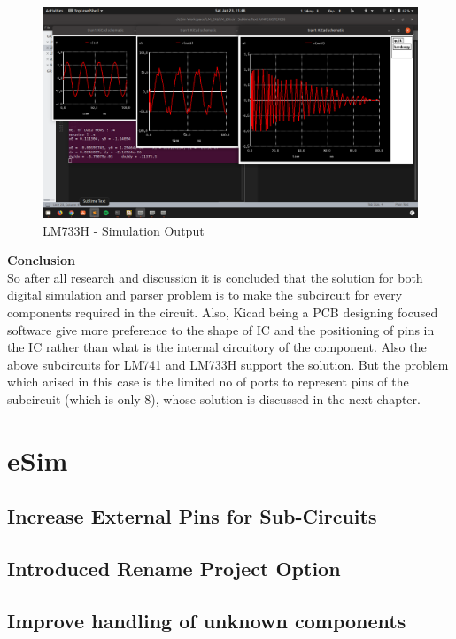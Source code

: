 \documentclass[12pt,a4paper]{report}
\begin{document}
\vspace{5mm}
\begin{figure}[h]
	\centering
	\includegraphics[width=\textwidth]{lm733h_sim}
	\caption{LM733H - Simulation Output}
\end{figure}
\vspace{5mm}
\textbf{\Large Conclusion}
\vspace{5mm}
\\
So after all research and discussion it is concluded that the solution for both digital simulation and parser problem is to make the subcircuit for every components required in the circuit. Also, Kicad being a PCB designing focused software give more preference to the shape of IC and the positioning of pins in the IC rather than what is the internal circuitory of the component. Also the above subcircuits for LM741 and LM733H support the solution. But the problem which arised in this case is the limited no of ports to represent pins of the subcircuit (which is only 8), whose solution is discussed in the next chapter.



\chapter{\textbf{eSim}}

\section{Increase External Pins for Sub-Circuits}
\section{Introduced Rename Project Option}
\section{Improve handling of unknown components}
\end{document}
